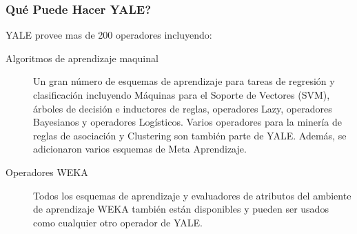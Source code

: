 \subsubsection{Qu\'e Puede Hacer YALE?}

YALE provee mas de 200 operadores incluyendo:

\begin{description}
\item [Algoritmos de aprendizaje maquinal] Un gran n\'umero de esquemas de aprendizaje para tareas de regresi\'on
y clasificaci\'on incluyendo M\'aquinas para el Soporte de Vectores (SVM), \'arboles de decisi\'on e inductores
de reglas, operadores Lazy, operadores Bayesianos y operadores Log\'isticos. Varios operadores para la miner\'ia
de reglas de asociaci\'on y Clustering son tambi\'en parte de YALE.  Adem\'as, se adicionaron varios esquemas de
Meta Aprendizaje.

\item [Operadores WEKA] Todos los esquemas de aprendizaje y evaluadores de atributos del ambiente de aprendizaje
WEKA tambi\'en est\'an disponibles y pueden ser usados como cualquier otro operador de YALE.

\end{description}
